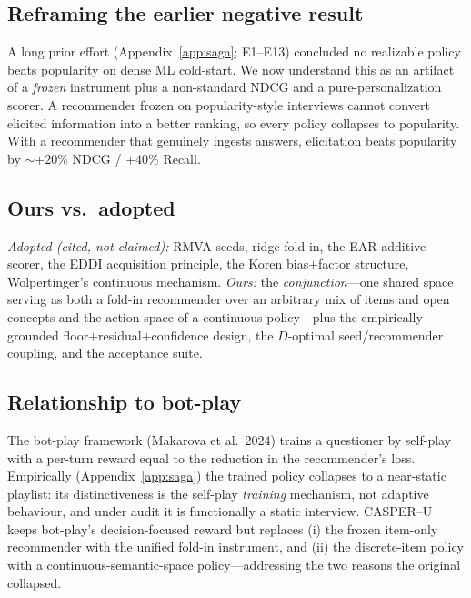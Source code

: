 \documentclass[11pt]{article}
\begin{document}
\subsection{Reframing the earlier negative result}
A long prior effort (Appendix~\ref{app:saga}; E1--E13) concluded no realizable policy beats popularity on dense ML
cold-start. We now understand this as an artifact of a \emph{frozen} instrument plus a non-standard NDCG and a
pure-personalization scorer. A recommender frozen on popularity-style interviews cannot convert elicited
information into a better ranking, so every policy collapses to popularity. With a recommender that genuinely
ingests answers, elicitation beats popularity by ${\sim}{+}20\%$ NDCG / ${+}40\%$ Recall.

\subsection{Ours vs.\ adopted}
\emph{Adopted (cited, not claimed):} RMVA seeds, ridge fold-in, the EAR additive scorer, the EDDI acquisition
principle, the Koren bias$+$factor structure, Wolpertinger's continuous mechanism. \emph{Ours:} the
\emph{conjunction}---one shared space serving as both a fold-in recommender over an arbitrary mix of items and open
concepts and the action space of a continuous policy---plus the empirically-grounded floor$+$residual$+$confidence
design, the $D$-optimal seed/recommender coupling, and the acceptance suite.

\subsection{Relationship to bot-play}
The bot-play framework (Makarova et al.\ 2024) trains a questioner by self-play with a per-turn reward equal to the
reduction in the recommender's loss. Empirically (Appendix~\ref{app:saga}) the trained policy collapses to a
near-static playlist: its distinctiveness is the self-play \emph{training} mechanism, not adaptive behaviour, and
under audit it is functionally a static interview. CASPER--U keeps bot-play's decision-focused reward but replaces
(i) the frozen item-only recommender with the unified fold-in instrument, and (ii) the discrete-item policy with a
continuous-semantic-space policy---addressing the two reasons the original collapsed.
\end{document}
